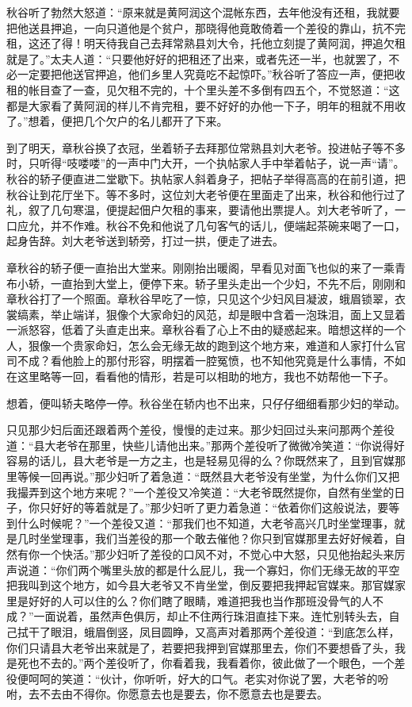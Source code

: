 \documentclass[12pt,UTF8]{ctexbook}
\begin{document}
{{{秋谷听了勃然大怒道：“原来就是黄阿润这个混帐东西，去年他没有还租，我就要把他送县押追，一向只道他是个贫户，那晓得他竟敢倚着一个差役的靠山，抗不完租，这还了得！明天待我自己去拜常熟县刘大令，托他立刻提了黄阿润，押追欠租就是了。”太夫人道：“只要他好好的把租还了出来，或者先还一半，也就罢了，不必一定要把他送官押追，他们乡里人究竟吃不起惊吓。”秋谷听了答应一声，便把收租的帐目查了一查，见欠租不完的，十个里头差不多倒有四五个，不觉怒道：“这都是大家看了黄阿润的样儿不肯完租，要不好好的办他一下子，明年的租就不用收了。”想着，便把几个欠户的名儿都开了下来。

到了明天，章秋谷换了衣冠，坐着轿子去拜那位常熟县刘大老爷。投进帖子等不多时，只听得“吱喽喽”的一声中门大开，一个执帖家人手中举着帖子，说一声“请”。秋谷的轿子便直进二堂歇下。执帖家人斜着身子，把帖子举得高高的在前引道，把秋谷让到花厅坐下。等不多时，这位刘大老爷便在里面走了出来，秋谷和他行过了礼，叙了几句寒温，便提起佃户欠租的事来，要请他出票提人。刘大老爷听了，一口应允，并不作难。秋谷不免和他说了几句客气的话儿，便端起茶碗来喝了一口，起身告辞。刘大老爷送到轿旁，打过一拱，便走了进去。

章秋谷的轿子便一直抬出大堂来。刚刚抬出暖阁，早看见对面飞也似的来了一乘青布小轿，一直抬到大堂上，便停下来。轿子里头走出一个少妇，不先不后，刚刚和章秋谷打了一个照面。章秋谷早吃了一惊，只见这个少妇风目凝波，蛾眉锁翠，衣裳缟素，举止端详，狠像个大家命妇的风范，却是眼中含着一泡珠泪，面上又显着一派怒容，低着了头直走出来。章秋谷看了心上不由的疑惑起来。暗想这样的一个人，狠像一个贵家命妇，怎么会无缘无故的跑到这个地方来，难道和人家打什么官司不成？看他脸上的那付形容，明摆着一腔冤愤，也不知他究竟是什么事情，不如在这里略等一回，看看他的情形，若是可以相助的地方，我也不妨帮他一下子。

想着，便叫轿夫略停一停。秋谷坐在轿内也不出来，只仔仔细细看那少妇的举动。

只见那少妇后面还跟着两个差役，慢慢的走过来。那少妇回过头来问那两个差役道：“县大老爷在那里，快些儿请他出来。”那两个差役听了微微冷笑道：“你说得好容易的话儿，县大老爷是一方之主，也是轻易见得的么？你既然来了，且到官媒那里等候一回再说。”那少妇听了着急道：“既然县大老爷没有坐堂，为什么你们又把我撮弄到这个地方来呢？”一个差役又冷笑道：“大老爷既然提你，自然有坐堂的日子，你只好好的等着就是了。”那少妇听了更力着急道：“依着你们这般说法，要等到什么时候呢？”一个差役又道：“那我们也不知道，大老爷高兴几时坐堂理事，就是几时坐堂理事，我们当差役的那一个敢去催他？你只到官媒那里去好好候着，自然有你一个快活。”那少妇听了差役的口风不对，不觉心中大怒，只见他抬起头来厉声说道：“你们两个嘴里头放的都是什么屁儿，我一个寡妇，你们无缘无故的平空把我叫到这个地方，如今县大老爷又不肯坐堂，倒反要把我押起官媒来。那官媒家里是好好的人可以住的么？你们瞎了眼睛，难道把我也当作那班没骨气的人不成？”一面说着，虽然声色俱厉，却止不住两行珠泪直挂下来。连忙别转头去，自己拭干了眼泪，蛾眉倒竖，凤目圆睁，又高声对着那两个差役道：“到底怎么样，你们只请县大老爷出来就是了，若要把我押到官媒那里去，你们不要想昏了头，我是死也不去的。”两个差役听了，你看着我，我看着你，彼此做了一个眼色，一个差役便呵呵的笑道：“伙计，你听听，好大的口气。老实对你说了罢，大老爷的吩咐，去不去由不得你。你愿意去也是要去，你不愿意去也是要去。

}}}
\end{document}
